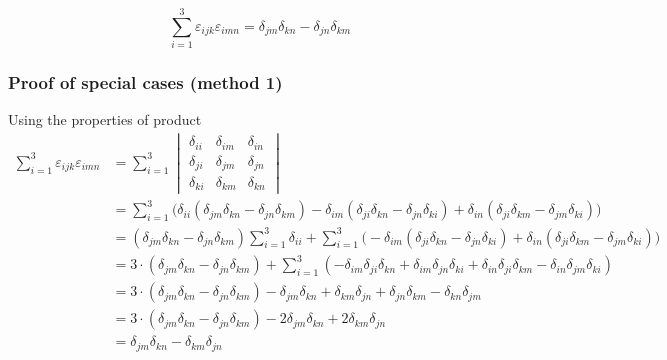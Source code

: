 \documentclass[12pt]{article}
\begin{document}
\begin{equation}
\sum _{i=1}^{3}\varepsilon _{ijk}\varepsilon _{imn}=\delta _{jm}\delta _{kn}-\delta _{jn}\delta _{km}
\end{equation}

\subsubsection{Proof of special cases (method 1)}

Using the properties of product
\begin{equation}
\begin{aligned}
\sum _{i=1}^{3}\varepsilon _{ijk}\varepsilon _{imn}
&= \sum _{i=1}^{3}\begin{vmatrix}
\delta _{ii}&\delta _{im}&\delta _{in}\\
\delta _{ji}&\delta _{jm}&\delta _{jn}\\
\delta _{ki}&\delta _{km}&\delta _{kn}
\end{vmatrix}\\[6pt]
&= \sum _{i=1}^{3}\bigg(\delta _{ii} \left(\delta _{jm}\delta _{kn}-\delta _{jn}\delta _{km}\right)
-\delta _{im} \left(\delta _{ji}\delta _{kn}-\delta _{jn}\delta _{ki}\right)
+\delta _{in} \left(\delta _{ji}\delta _{km}-\delta _{jm}\delta _{ki}\right)\bigg)\\
&= \left(\delta _{jm}\delta _{kn}-\delta _{jn}\delta _{km}\right)  \sum _{i=1}^{3}\delta _{ii}
+ \sum _{i=1}^{3}\bigg(-\delta _{im} \left(\delta _{ji}\delta _{kn}-\delta _{jn}\delta _{ki}\right)
+\delta _{in} \left(\delta _{ji}\delta _{km}-\delta _{jm}\delta _{ki}\right)\bigg)\\
&= 3\cdot\left(\delta _{jm}\delta _{kn}-\delta _{jn}\delta _{km}\right)
+ \sum _{i=1}^{3}\left(
-\delta _{im}\delta _{ji}\delta _{kn} + \delta _{im}\delta _{jn}\delta _{ki}
+\delta _{in}\delta _{ji}\delta _{km} - \delta _{in}\delta _{jm}\delta _{ki}
\right)\\[6pt]
&= 3\cdot\left(\delta _{jm}\delta _{kn}-\delta _{jn}\delta _{km}\right)
-\delta _{jm}\delta _{kn} + \delta _{km}\delta _{jn}
+\delta _{jn}\delta _{km} - \delta _{kn}\delta _{jm}\\[6pt]
&= 3\cdot\left(\delta _{jm}\delta _{kn}-\delta _{jn}\delta _{km}\right)
-2\delta _{jm}\delta _{kn} + 2\delta _{km}\delta _{jn}\\[6pt]
&= \delta _{jm}\delta _{kn}-\delta _{km}\delta _{jn}
\end{aligned}
\end{equation}
\end{document}
